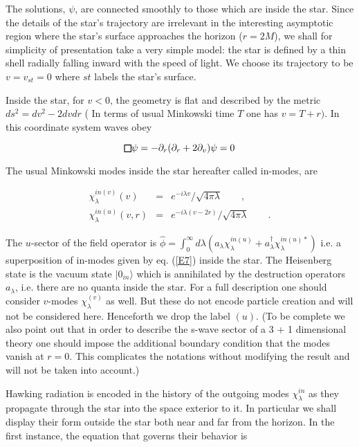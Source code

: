 \documentclass[12pt]{article}
\def\sqr#1#2{{\vcenter{\vbox{\hrule height.#2pt
          \hbox{\vrule width.#2pt height#1pt \kern#1pt
           \vrule width.#2pt}
           \hrule height.#2pt}}}}
\def\square{\mathchoice\sqr68\sqr68\sqr{4.2}6\sqr{3}6}
\begin{document}
\noindent The solutions, $ \psi$, are connected smoothly to those which are
inside the star. Since the details of the star's trajectory are irrelevant in
the interesting asymptotic region where the star's surface approaches the
horizon ($r = 2 M$), we shall for simplicity of presentation take a very simple
model: the star is defined by a thin shell radially falling inward with the
speed of light. We choose its trajectory to be $ v = v_{st} = 0$ where $st$
labels the star's surface. 

Inside the star, for $v<0$, the geometry is flat and
described by the metric $ ds^2 = d v^2 - 2 d v d r$ ( In terms of usual
Minkowski time $T$ one has $ v = T + r).$ In this coordinate system waves obey 

\begin{equation}
\label{E5}
\square {\psi} = -\partial_r (\partial_r + 2 \partial_v) \psi = 0
\end{equation}



\noindent 
The usual Minkowski modes inside the star hereafter called in-modes, are

\begin{eqnarray}
\chi_{\lambda} ^{in (v)} ( v)  &=& e^{-i \lambda v} / \sqrt{4 \pi \lambda}
\qquad ,\label{E6} \\
\chi_{\lambda} ^{in (u)} (v, r) &=& e^{-i \lambda (v - 2 r)} / \sqrt{4 \pi
\lambda}\qquad .\label{E7}
\end{eqnarray}

\noindent The $u$-sector of the field operator is $ \hat \phi = \int_{0}
^{\infty} d \lambda \left( a_\lambda \chi_\lambda^{in (u)} + a_\lambda^\dagger
\chi_\lambda^{in (u) *} \right) $ i.e. a superposition of in-modes given by
 eq. (\ref{E7}) inside the star. The Heisenberg state is the vacuum state 
$\vert{0_{in }}\rangle$ which is annihilated by the destruction operators $ a_\lambda$,
i.e. there are no quanta inside the star. For a full description one should
consider $v$-modes $ \chi_\lambda ^{(v)}$ as well. But these do not encode
particle creation and will not be considered here. Henceforth we drop the label
$(u)$. (To be complete we also point out that in order to describe the s-wave
sector of a 3 + 1 dimensional theory one should impose the additional boundary
condition that the modes vanish at $r = 0$. This complicates the notations
without modifying   the result and will not  be taken  into account.)

 Hawking radiation is encoded in the history of the outgoing modes $
\chi_\lambda^{in}$ as they propagate through the star into the space exterior
to it. In particular we shall display their form outside the star both near and
far from the horizon. In the first instance, the equation that governs their
behavior is
\end{document}
